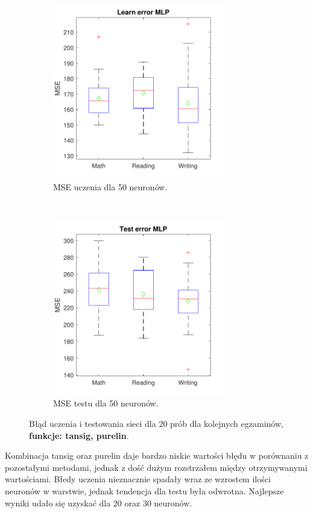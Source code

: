 \documentclass[12pt]{article}
\begin{document}
\begin{figure}[H]
\begin{subfigure}[t]{0.48\textwidth} 
\centering
\includegraphics[height=3in]{tansig_purelin_50_learnBoxplot.pdf}
\caption{MSE uczenia dla 50 neuronów.}
\end{subfigure}
~~
\begin{subfigure}[t]{0.48\textwidth} 
\centering
\includegraphics[height=3in]{tansig_purelin_50_testBoxplot.pdf}
\caption{MSE testu dla 50 neuronów.}
\end{subfigure}

\caption{Błąd uczenia i testowania sieci dla 20 prób dla kolejnych egzaminów, \textbf{funkcje: tansig, purelin}.}
\end{figure}


Kombinacja tansig oraz purelin daje bardzo niskie wartości błędu w porównaniu z pozostałymi metodami, jednak z dość dużym rozstrzałem między otrzymywanymi wartościami. Błedy uczenia nieznacznie spadały wraz ze wzrostem ilości neuronów w warstwie, jednak tendencja dla testu była odwrotna. Najlepsze wyniki udało się uzyskać dla 20 oraz 30 neuronów.
\end{document}
